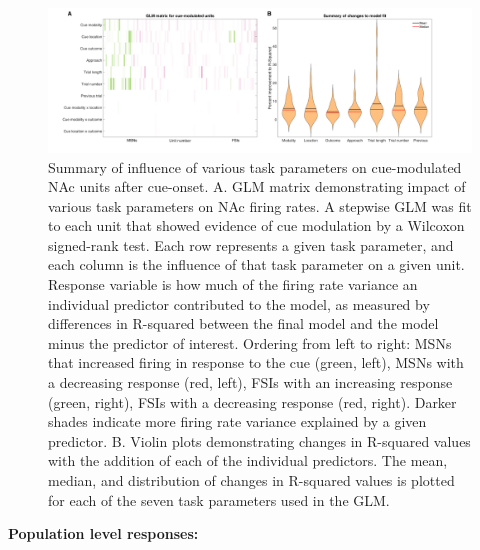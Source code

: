 \documentclass[11pt]{article}
\begin{document}
\begin{figure}[h]
\centering
\includegraphics[width=\textwidth]{Fig 6 - GLM.png}
\caption{Summary of influence of various task parameters on cue-modulated NAc units after cue-onset.  A. GLM matrix demonstrating impact of various task parameters on NAc firing rates. A stepwise GLM was fit to each unit that showed evidence of cue modulation by a Wilcoxon signed-rank test. Each row represents a given task parameter, and each column is the influence of that task parameter on a given unit. Response variable is how much of the firing rate variance an individual predictor contributed to the model, as measured by differences in R-squared between the final model and the model minus the predictor of interest. Ordering from left to right: MSNs that increased firing in response to the cue (green, left), MSNs with a decreasing response (red, left), FSIs with an increasing response (green, right), FSIs with a decreasing response (red, right). Darker shades indicate more firing rate variance explained by a given predictor. B. Violin plots demonstrating changes in R-squared values with the addition of each of the individual predictors. The mean, median, and distribution of changes in R-squared values is plotted for each of the seven task parameters used in the GLM.}
\label{fig:GLM}
\end{figure}

{\bf Population level responses:}
\end{document}
